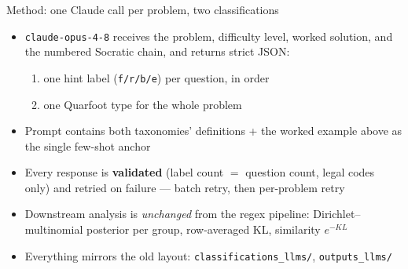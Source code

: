 \documentclass[10pt,aspectratio=169]{beamer}
\begin{document}
\begin{frame}{Method: one Claude call per problem, two classifications}
  \begin{itemize}
    \item \texttt{claude-opus-4-8} receives the problem, difficulty level, worked
          solution, and the numbered Socratic chain, and returns strict JSON:
    \begin{enumerate}
      \item one hint label (\texttt{f/r/b/e}) per question, in order
      \item one Quarfoot type for the whole problem
    \end{enumerate}
    \item Prompt contains both taxonomies' definitions + the worked example above as
          the single few-shot anchor
    \item Every response is \textbf{validated} (label count $=$ question count, legal codes
          only) and retried on failure --- batch retry, then per-problem retry
    \item Downstream analysis is \emph{unchanged} from the regex pipeline:
          Dirichlet--multinomial posterior per group, row-averaged KL, similarity $e^{-KL}$
    \item Everything mirrors the old layout:
          \texttt{classifications\_llms/}, \texttt{outputs\_llms/}
  \end{itemize}
\end{frame}
\end{document}

